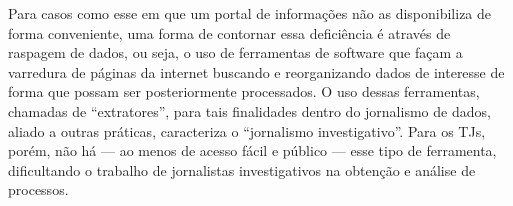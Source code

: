 Para casos como esse em que um portal de informações não as disponibiliza de
forma conveniente, uma forma de contornar essa deficiência é através de
raspagem de dados, ou seja, o uso de ferramentas de software que façam a
varredura de páginas da internet buscando e reorganizando dados de interesse de
forma que possam ser posteriormente processados. O uso dessas ferramentas,
chamadas de ``extratores'', para tais finalidades dentro do jornalismo de
dados, aliado a outras práticas, caracteriza o ``jornalismo investigativo''.
Para os TJs, porém, não há --- ao menos de acesso fácil e público --- esse tipo
de ferramenta, dificultando o trabalho de jornalistas investigativos na
obtenção e análise de processos.
